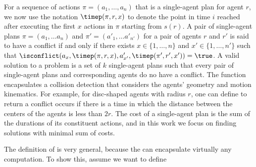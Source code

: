 For a sequence of actions $\pi=(a_1,\ldots, a_n)$ that is a single-agent plan for agent $r$, 
we now use the notation $\timep(\pi,r,x)$ to denote the point in time $i$ reached after executing the first $x$ actions in $\pi$ starting from $s(r)$. 
A pair of single-agent plans $\pi=(a_1,\ldots a_n)$ and $\pi'=(a'_1,\ldots a'_{n'})$
for a pair of agents $r$ and $r'$ is said to have a conflict if and only if there exists $x\in\{1,\ldots, n\}$
and $x'\in\{1,\ldots, n'\}$ such that $\isconflict(a_x, \timep(\pi,r,x), a'_{x'}, \timep(\pi', r', x'))=\true$. 
A valid solution to a \mapfect problem is a set of $k$ single-agent plans such that every pair of single-agent plans and corresponding agents do no have a conflict. 
The \isconflict function encapsulates a collision detection that considers the agents' geometry and motion kinematics. 
For example, for disc-shaped agents with radius $r$, one can define \isconflict to return a conflict occurs if there is a time in which the distance between the centers of the agents is less than $2r$. 
The cost of a single-agent plan is the sum of the durations of its constituent actions, and in this work we focus on finding solutions with minimal sum of costs. 


The definition of \mapfect is very general, because the \isconflict can encapsulate virtually any computation. 
To show this, assume 
we want to define 





